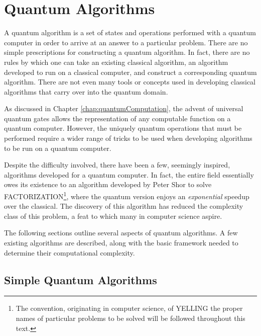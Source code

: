 

\chapter{Quantum Algorithms}
\label{chap:quantumAlgorithms}
%

A quantum algorithm is a set of states and operations performed
with a quantum computer in order to arrive at an answer to a particular
problem.
There are no simple prescriptions for constructing a quantum algorithm.
In fact, there are no rules by which one can take an existing classical algorithm,
an algorithm developed to run on a classical computer, and construct
a corresponding quantum algorithm.  There are not even many tools or concepts
used in developing classical algorithms that carry over into the quantum
domain.

As discussed in Chapter \ref{chap:quantumComputation}, 
the advent of universal quantum gates
allows the representation of any computable function on a 
quantum computer.  However, the uniquely quantum operations that 
must be performed 
require a wider range of tricks to be used when developing
algorithms to be run on a quantum computer.

Despite the difficulty involved, there have been a few, seemingly
inspired, algorithms developed for a quantum computer.
In fact, the entire field essentially owes its existence to 
an algorithm developed by Peter Shor\cite{Shor:94,Shor:00}
to solve FACTORIZATION\footnote{The convention, originating in computer 
science, of YELLING the proper names of particular problems to be solved 
will be followed throughout this text.}, where the quantum version 
enjoys an \emph{exponential} speedup over the classical.  
The discovery of this algorithm has reduced the complexity class of 
this problem, a feat to which many in computer science aspire.

The following sections outline several aspects of quantum
algorithms.  A few existing algorithms are described, along
with the basic framework needed to determine their computational
complexity.  

\section{Simple Quantum Algorithms}

